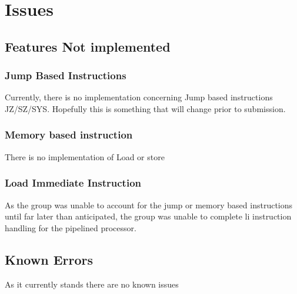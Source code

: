 \documentclass[conference]{IEEEtran}
\begin{document}
\section{Issues}
\subsection{Features Not implemented}
\subsubsection{Jump Based Instructions}
Currently, there is no implementation concerning Jump based instructions JZ/SZ/SYS. 
Hopefully this is something that will change prior to submission. 
\subsubsection{Memory based instruction}
There is no implementation of Load or store 
\subsubsection{Load Immediate Instruction} 
As the group was unable to account for the jump or memory based instructions until far later 
than anticipated, the group was unable to complete li instruction handling for the pipelined
processor. 

\subsection{Known Errors}
As it currently stands there are no known issues
\end{document}

